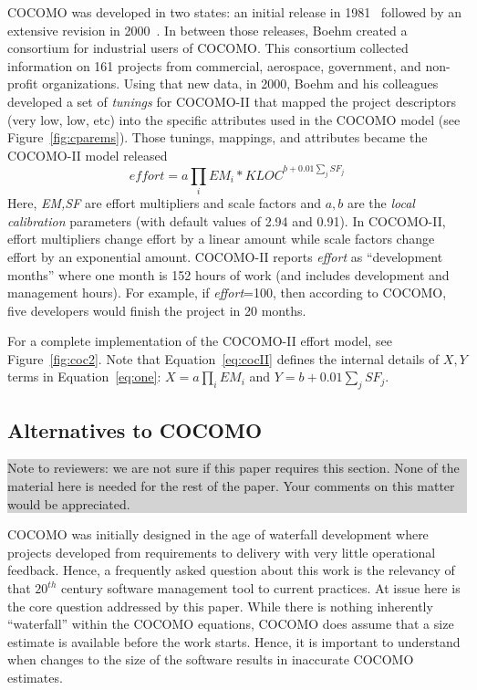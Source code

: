 \documentclass[final,twocolumn]{elsarticle}
\newcommand{\fig}[1]{Figure~\ref{fig:#1}}
\newcommand{\eq}[1]{Equation~\ref{eq:#1}}
\theoremstyle{break}
\begin{document}
  COCOMO was developed in two states: an initial release in 1981~\cite{boehm81}
  followed by an extensive revision in  2000~\cite{boehm00b}.
  In between those releases,
  Boehm created a consortium for
industrial users of COCOMO.
This consortium
collected information on 161 projects from commercial,
aerospace, government, and non-profit organizations.
Using that new data, in 2000, Boehm and his colleagues developed
a set of   {\em tunings} for COCOMO-II that
mapped the project descriptors (very low, low, etc)
into the specific attributes used in the COCOMO model (see \fig{cparems}).
Those tunings, mappings, and attributes became the COCOMO-II model
released 
\begin{equation}\label{eq:cocII}
\mathit{effort}=a\prod_i EM_i *\mathit{KLOC}^{b+0.01\sum_j SF_j}
\end{equation}
Here, {\em EM,SF} are effort multipliers and scale factors and $a,b$ are the
{\em local calibration} parameters (with default values of 2.94 and 0.91).  In
COCOMO-II, effort multipliers change effort by a linear amount while scale
factors change effort by an exponential amount.  COCOMO-II reports {\em effort}
as ``development months'' where one month is 152 hours of work (and includes
development and management hours).  For example, if {\em effort}=100, then
according to COCOMO, five developers would finish the project in 20 months.

For a complete implementation of the COCOMO-II effort model, see \fig{coc2}.
Note that \eq{cocII} defines the internal details of $X,Y$ terms in \eq{one}:
\mbox{$X=a\prod_i EM_i$} and \mbox{$Y=b+0.01\sum_j SF_j$}.




\subsection{Alternatives to COCOMO} \label{sect:altCoc}

\noindent\colorbox{lightgray}{%
    \parbox{\dimexpr\linewidth-2\fboxsep}%
        {Note to reviewers: we are not sure if this paper requires this section. None of the material here is needed for the rest of the paper. Your comments on this matter would be appreciated.
        }
}
 
COCOMO was initially designed in the age of
waterfall development where projects developed from
requirements to delivery with very little
operational feedback.  Hence, a frequently asked
question about this work is the relevancy of that
$20^{th}$ century software management tool to
current practices.  At issue here is the core
question addressed by this paper.  While there is
nothing inherently ``waterfall'' within the COCOMO
equations, COCOMO does assume that a size estimate
is available before the work starts.  Hence, it is
important to understand when changes to the size of
the software results in inaccurate COCOMO estimates.
\end{document}
